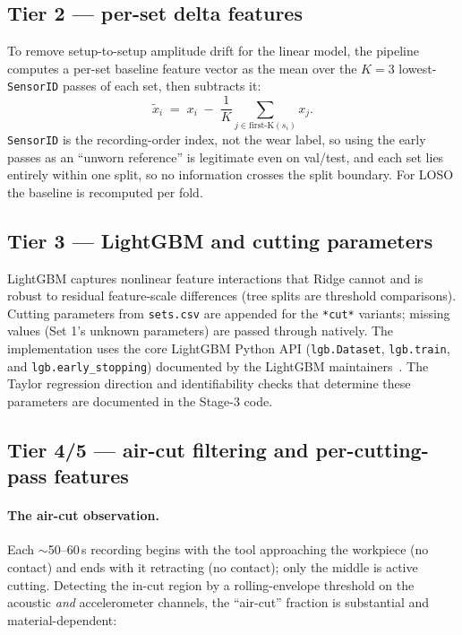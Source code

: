 \documentclass[11pt,a4paper]{article}
\newcommand{\code}[1]{\texttt{#1}}
\begin{document}
\subsection{Tier 2 --- per-set delta features}
\label{sec:tier2}
To remove setup-to-setup amplitude drift for the linear model, the pipeline
computes a per-set baseline feature vector as the mean over the $K{=}3$
lowest-\code{SensorID} passes of each set, then subtracts it:
\begin{equation*}
    \tilde{x}_i \;=\; x_i \;-\;
        \frac{1}{K}\sum_{j \in \text{first-K}(s_i)}\!\!\!\! x_j .
\end{equation*}
\code{SensorID} is the recording-order index, not the wear label, so using the
early passes as an ``unworn reference'' is legitimate even on val/test, and each
set lies entirely within one split, so no information crosses the split
boundary. For LOSO the baseline is recomputed per fold.

\subsection{Tier 3 --- LightGBM and cutting parameters}
LightGBM captures nonlinear feature interactions that Ridge cannot and is
robust to residual feature-scale differences (tree splits are threshold
comparisons). Cutting parameters from \code{sets.csv} are appended for the
\code{*cut*} variants; missing values (Set 1's unknown parameters) are passed
through natively. The implementation uses the core LightGBM Python API
(\code{lgb.Dataset}, \code{lgb.train}, and \code{lgb.early\_stopping}) documented
by the LightGBM maintainers~\cite{lightgbm-python-api}. The Taylor regression
direction and identifiability checks that determine these parameters are
documented in the Stage-3 code.

\subsection{Tier 4/5 --- air-cut filtering and per-cutting-pass features}
\label{sec:aircut}
\paragraph{The air-cut observation.} Each $\sim$50--60\,s recording begins with
the tool approaching the workpiece (no contact) and ends with it retracting
(no contact); only the middle is active cutting. Detecting the in-cut region by
a rolling-envelope threshold on the acoustic \emph{and} accelerometer channels,
the ``air-cut'' fraction is substantial and material-dependent:
\end{document}
